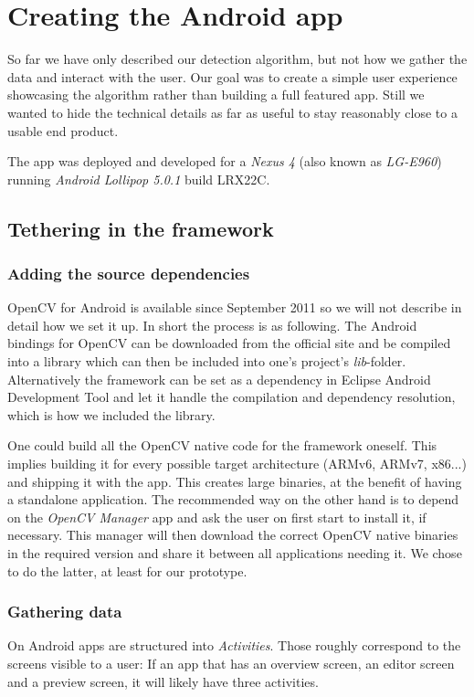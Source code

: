 
\chapter{Creating the Android app}
\label{android}
	So far we have only described our detection algorithm, but not how we gather the data and interact with the user. Our goal was to create a simple user experience showcasing the algorithm rather than building a full featured app. Still we wanted to hide the technical details as far as useful to stay reasonably close to a usable end product.

	The app was deployed and developed for a \textit{Nexus 4} (also known as \textit{LG-E960}) running \textit{Android Lollipop 5.0.1} build LRX22C.

	\section{Tethering in the framework}
	\label{android-framework}
	\subsection{Adding the source dependencies}
	\label{android-framework-dependencies}
	OpenCV for Android is available since September 2011 so we will not describe in detail how we set it up. In short the process is as following. The Android bindings for OpenCV can be downloaded from the official site and be compiled into a library which can then be included into one's project's \textit{lib}-folder. Alternatively the framework can be set as a dependency in Eclipse Android Development Tool and let it handle the compilation and dependency resolution, which is how we included the library.

	One could build all the OpenCV native code for the framework oneself. This implies building it for every possible target architecture (ARMv6, ARMv7, x86...) and shipping it with the app. This creates large binaries, at the benefit of having a standalone application. The recommended way on the other hand is to depend on the \textit{OpenCV Manager} app and ask the user on first start to install it, if necessary. This manager will then download the correct OpenCV native binaries in the required version and share it between all applications needing it. We chose to do the latter, at least for our prototype.

	\subsection{Gathering data}
	\label{android-framework-gathering}
	On Android apps are structured into \textit{Activities}. Those roughly correspond to the screens visible to a user: If an app that has an overview screen, an editor screen and a preview screen, it will likely have three activities.

